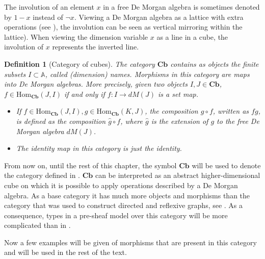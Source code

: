 \documentclass[12pt,a4paper,twoside,xetex]{book} %
\newtheorem{definition}[theorem]{Definition}
\newcommand{\homo}[3]{\text{Hom}_{#1}\left(#2,#3\right)}
\newcommand{\cube}[0]{\textbf{Cb}}
\begin{document}
The involution of an element $x$ in a free De Morgan algebra is sometimes 
denoted by $1-x$ instead  of $\neg x$. Viewing a De Morgan algebra as a lattice with extra operations (see ), the involution can be seen as vertical mirroring within the lattice). When viewing the dimension variable $x$ as a line in a cube, the involution of $x$ represents the inverted line. 

\begin{definition}[Category of cubes]\label{cubcat}
  The category $\cube$ contains as objects the  finite subsets $I \subset 
\mathbb{A}$, called (dimension) names. Morphisms in this category are maps into 
De Morgan algebras. More precisely, given two objects $I,J \in \cube$, $f 
\in \text{Hom}_{\cube}(J,I)$ if and only if $f: I \rightarrow dM(J)$ is a 
set map.
  \begin{itemize}
  \item  If $f \in \homo{\cube}{J}{I}, g \in \homo{\cube}{K}{J}$, 
the composition $g \circ f$, written as $fg$, is defined as the composition  
$\hat{g} \circ f$, where $\hat{g}$ is the extension of $g$ to the free De 
Morgan algebra $dM(J)$.
    \item The identity map in this category is just the identity.
\end{itemize}
    \end{definition}

From now on, until the rest of this chapter, the symbol $\cube$ will be 
used to denote the category defined in . $\cube$ can be 
interpreted as an abstract higher-dimensional cube on which it is possible to 
apply operations described by a De Morgan algebra. As a base category it has 
much more objects and morphisms than the category that was used to construct 
directed and reflexive graphs, see . As a consequence, types in 
a pre-sheaf model over this category will be more complicated than in 
.

Now a few examples will be given of morphisms that are present in this category 
and will be used in the rest of the text.
\end{document}
